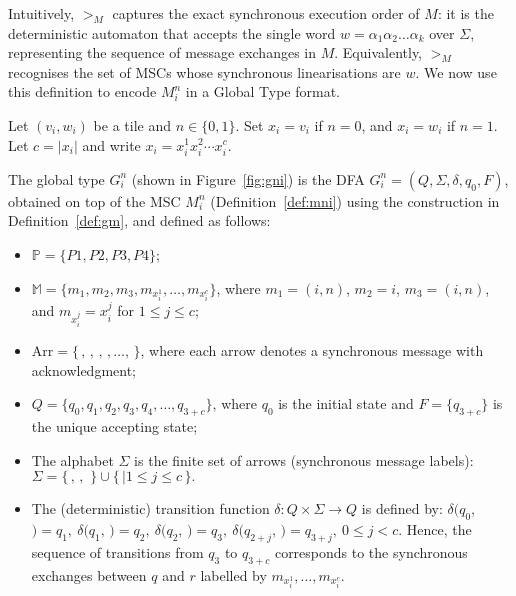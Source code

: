 Intuitively, $\gt_M$ captures the exact synchronous execution order of $M$:  
it is the deterministic automaton that accepts the single word  
$w = \alpha_1 \alpha_2 \ldots \alpha_k$ over $\Sigma$,  
representing the sequence of message exchanges in $M$.  
Equivalently, $\gt_M$ recognises the set of MSCs whose synchronous  
linearisations are $w$.
We now use this definition to encode $M_i^n$ in a Global Type format.

\bigskip

\begin{definition}[$G_i^n$]\label{def:gni}
Let $(v_i, w_i)$ be a tile and $n \in \{0,1\}$.  
Set $x_i = v_i$ if $n = 0$, and $x_i = w_i$ if $n = 1$.  
Let $c = |x_i|$ and write $x_i = x_i^1 x_i^2 \cdots x_i^c$.

The global type $G_i^n$ (shown in Figure~\ref{fig:gni}) is the DFA
$G_i^n = (Q, \Sigma, \delta, q_0, F)$, obtained
on top of the MSC $M_i^n$ (Definition~\ref{def:mni}) using the 
construction in Definition~\ref{def:gm}, and defined as follows:
\begin{itemize}
	\item $\mathbb{P} = \{P1, P2, P3, P4\}$;
	\item $\mathbb{M} = \{m_1, m_2, m_3, m_{x_i^1}, \ldots, m_{x_i^c}\}$,
	      where $m_1 = (i, n)$, $m_2 = i$, $m_3 = (i, n)$, and
	      $m_{x_i^j} = x_i^j$ for $1 \le j \le c$;
	\item $\text{Arr} = \{\,$$,\, $$,\,
	      $$,\, $$, \ldots,
	      $$\,\}$, where each arrow denotes
	      a synchronous message with acknowledgment;
	\item $Q = \{q_0, q_1, q_2, q_3, q_4, \ldots, q_{3+c}\}$,  
	      where $q_0$ is the initial state and  
	      $F = \{q_{3+c}\}$ is the unique accepting state;
	\item The alphabet $\Sigma$ is the finite set of arrows (synchronous message labels):  
	      $
	      \Sigma = 
	      \{\,$$,\,
	           $$,\,
	           $$\,\}
	      \cup
	      \{\,$$ \mid 1 \le j \le c\,\}.
	      $
	\item The (deterministic) transition function
	      $\delta : Q \times \Sigma \to Q$ is defined by:
	        $  \delta(q_0,\, $$) = q_1,\ 
	          \delta(q_1,\, $$) = q_2, \ 
	          \delta(q_2,\, $$) = q_3, \ 
	          \delta(q_{2+j},\, $$) = q_{3+j}, 
	          \  0 \le j < c.$
	      Hence, the sequence of transitions from $q_3$ to $q_{3+c}$ 
	      corresponds to the synchronous exchanges between $q$ and $r$
	      labelled by $m_{x_i^1}, \ldots, m_{x_i^c}$.
\end{itemize}


\end{definition}

